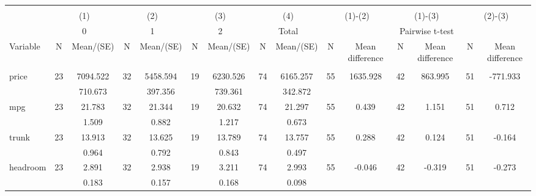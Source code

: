 
\begin{tabular}{@{\extracolsep{5pt}}lcccccccccccccc}
\\[-1.8ex]\hline \hline \\[-1.8ex]
 & \multicolumn{2}{c}{(1)}  & \multicolumn{2}{c}{(2)}  & \multicolumn{2}{c}{(3)}  & \multicolumn{2}{c}{(4)}  & \multicolumn{2}{c}{(1)-(2)} & \multicolumn{2}{c}{(1)-(3)} & \multicolumn{2}{c}{(2)-(3)} \\
 & \multicolumn{2}{c}{0}  & \multicolumn{2}{c}{1}  & \multicolumn{2}{c}{2}  & \multicolumn{2}{c}{Total}  & \multicolumn{6}{c}{Pairwise t-test}  \\
Variable & N & Mean/(SE) & N & Mean/(SE) & N & Mean/(SE) & N & Mean/(SE) & N & Mean difference & N & Mean difference & N & Mean difference \\ \hline \\[-1.8ex] 
price   & 23    &  7094.522    & 32    &  5458.594    & 19    &  6230.526    & 74    &  6165.257    & 55    &  1635.928    & 42    &   863.995    & 51    &  -771.933   \\
 &   &   710.673  &   &   397.356  &   &   739.361  &   &   342.872  &   &  &   &  &   &   \\
mpg   & 23    &    21.783    & 32    &    21.344    & 19    &    20.632    & 74    &    21.297    & 55    &     0.439    & 42    &     1.151    & 51    &     0.712   \\
 &   &     1.509  &   &     0.882  &   &     1.217  &   &     0.673  &   &  &   &  &   &   \\
trunk   & 23    &    13.913    & 32    &    13.625    & 19    &    13.789    & 74    &    13.757    & 55    &     0.288    & 42    &     0.124    & 51    &    -0.164   \\
 &   &     0.964  &   &     0.792  &   &     0.843  &   &     0.497  &   &  &   &  &   &   \\
headroom   & 23    &     2.891    & 32    &     2.938    & 19    &     3.211    & 74    &     2.993    & 55    &    -0.046    & 42    &    -0.319    & 51    &    -0.273   \\
 &   &     0.183  &   &     0.157  &   &     0.168  &   &     0.098  &   &  &   &  &   &   \\

\end{tabular}
